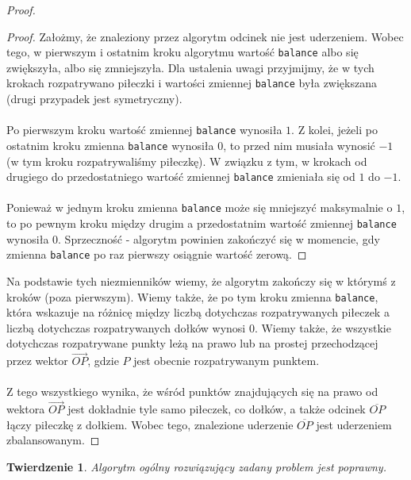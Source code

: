 \documentclass[10pt,a4paper]{article}
\newtheorem{theorem}{Twierdzenie}
\begin{document}
\begin{proof}
\begin{addmargin}[1.25em]{0em}
			\begin{proof}
				Założmy, że znaleziony przez algorytm odcinek nie jest uderzeniem. Wobec tego, w pierwszym i ostatnim kroku algorytmu wartość \texttt{balance} albo się zwiększyła, albo się zmniejszyła. Dla ustalenia uwagi przyjmijmy, że w tych krokach rozpatrywano piłeczki i wartości zmiennej \texttt{balance} była zwiększana (drugi przypadek jest symetryczny).\\~\\
				Po pierwszym kroku wartość zmiennej \texttt{balance} wynosiła $1$. Z kolei, jeżeli po ostatnim kroku zmienna \texttt{balance} wynosiła $0$, to przed nim musiała wynosić $-1$ (w tym kroku rozpatrywaliśmy piłeczkę). W związku z tym, w krokach od drugiego do przedostatniego wartość zmiennej \texttt{balance} zmieniała się od $1$ do $-1$. \\~\\
				Ponieważ w jednym kroku zmienna \texttt{balance} może się mniejszyć maksymalnie o $1$, to po pewnym kroku między drugim a przedostatnim wartość zmiennej \texttt{balance} wynosiła $0$. Sprzeczność - algorytm powinien zakończyć się w momencie, gdy zmienna \texttt{balance} po raz pierwszy osiągnie wartość zerową.
			\end{proof}
		\end{addmargin}

		Na podstawie tych niezmienników wiemy, że algorytm zakończy się w którymś z kroków (poza pierwszym). Wiemy także, że po tym kroku zmienna \texttt{balance}, która wskazuje na różnicę między liczbą dotychczas rozpatrywanych piłeczek a liczbą dotychczas rozpatrywanych dołków wynosi $0$. Wiemy także, że wszystkie dotychczas rozpatrywane punkty leżą na prawo lub na prostej przechodzącej przez wektor $\overrightarrow{OP}$, gdzie $P$ jest obecnie rozpatrywanym punktem.\\~\\
		Z tego wszystkiego wynika, że wśród punktów znajdujących się na prawo od wektora $\overrightarrow{OP}$ jest dokładnie tyle samo piłeczek, co dołków, a także odcinek $\overline{OP}$ łączy piłeczkę z dołkiem. Wobec tego, znalezione uderzenie $\overline{OP}$ jest uderzeniem zbalansowanym.
	\end{proof}

	\vspace{2em}

	\begin{theorem} \label{theorem:2}
		Algorytm ogólny rozwiązujący zadany problem jest poprawny.
	\end{theorem}
	
\end{document}
